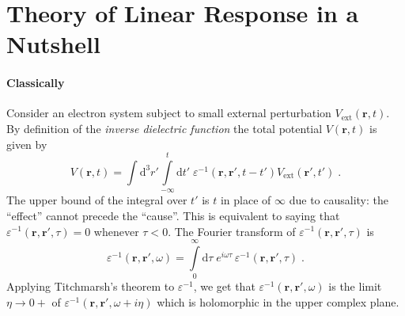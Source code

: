 \documentclass[a4paper,12pt]{article}
\begin{document}
\section{Theory of Linear Response in a Nutshell} \label{sec:linear_response}
    \paragraph{Classically} Consider an electron system subject to small external perturbation $V_\text{ext}(\mathbf{r}, t)$. By definition of the \textit{inverse dielectric function} the total potential $V(\mathbf{r}, t)$ is given by
    \begin{equation} \label{eq:cl:potentials_t}
        V(\mathbf{r}, t) 
            = \int\!\! \text{d}^3 r' \!\! \int\limits_{-\infty}^{t}\!\! \text{d} t'\; \varepsilon^{-1}(\mathbf{r}, \mathbf{r'}, t - t') V_\text{ext}(\mathbf{r'}, t')\; .
    \end{equation}
    The upper bound of the integral over $t'$ is $t$ in place of $\infty$ due to causality: the ``effect'' cannot precede the ``cause''. This is equivalent to saying that $\varepsilon^{-1}(\mathbf{r}, \mathbf{r'}, \tau) = 0$ whenever $\tau < 0$. The Fourier transform of $\varepsilon^{-1}(\mathbf{r}, \mathbf{r'}, \tau)$ is
    \begin{equation} \label{eq:cl:inv_dielectric_w}
        \varepsilon^{-1}(\mathbf{r},\mathbf{r'},\omega) = \int\limits_{0}^{\infty} \!\! \text{d}\tau \; e^{i\omega \tau}\,\varepsilon^{-1}(\mathbf{r}, \mathbf{r'}, \tau)\; .
    \end{equation}
    Applying Titchmarsh's theorem to $\varepsilon^{-1}$, we get that $\varepsilon^{-1}(\mathbf{r}, \mathbf{r'}, \omega)$ is the limit $\eta \to 0+$ of $\varepsilon^{-1}(\mathbf{r}, \mathbf{r'}, \omega + i\eta)$ which is holomorphic in the upper complex plane.
\end{document}
